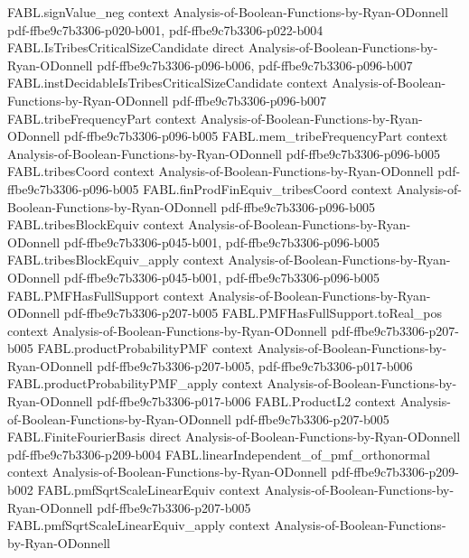 \begin{theorem}
\proofstep
  {FABL.signValue_neg}
  {context}
  {Analysis-of-Boolean-Functions-by-Ryan-ODonnell}
  {pdf-ffbe9c7b3306-p020-b001,
    pdf-ffbe9c7b3306-p022-b004}
\proofstep
  {FABL.IsTribesCriticalSizeCandidate}
  {direct}
  {Analysis-of-Boolean-Functions-by-Ryan-ODonnell}
  {pdf-ffbe9c7b3306-p096-b006,
    pdf-ffbe9c7b3306-p096-b007}
\proofstep
  {FABL.instDecidableIsTribesCriticalSizeCandidate}
  {context}
  {Analysis-of-Boolean-Functions-by-Ryan-ODonnell}
  {pdf-ffbe9c7b3306-p096-b007}
\proofstep
  {FABL.tribeFrequencyPart}
  {context}
  {Analysis-of-Boolean-Functions-by-Ryan-ODonnell}
  {pdf-ffbe9c7b3306-p096-b005}
\proofstep
  {FABL.mem_tribeFrequencyPart}
  {context}
  {Analysis-of-Boolean-Functions-by-Ryan-ODonnell}
  {pdf-ffbe9c7b3306-p096-b005}
\proofstep
  {FABL.tribesCoord}
  {context}
  {Analysis-of-Boolean-Functions-by-Ryan-ODonnell}
  {pdf-ffbe9c7b3306-p096-b005}
\proofstep
  {FABL.finProdFinEquiv_tribesCoord}
  {context}
  {Analysis-of-Boolean-Functions-by-Ryan-ODonnell}
  {pdf-ffbe9c7b3306-p096-b005}
\proofstep
  {FABL.tribesBlockEquiv}
  {context}
  {Analysis-of-Boolean-Functions-by-Ryan-ODonnell}
  {pdf-ffbe9c7b3306-p045-b001,
    pdf-ffbe9c7b3306-p096-b005}
\proofstep
  {FABL.tribesBlockEquiv_apply}
  {context}
  {Analysis-of-Boolean-Functions-by-Ryan-ODonnell}
  {pdf-ffbe9c7b3306-p045-b001,
    pdf-ffbe9c7b3306-p096-b005}
\proofstep
  {FABL.PMFHasFullSupport}
  {context}
  {Analysis-of-Boolean-Functions-by-Ryan-ODonnell}
  {pdf-ffbe9c7b3306-p207-b005}
\proofstep
  {FABL.PMFHasFullSupport.toReal_pos}
  {context}
  {Analysis-of-Boolean-Functions-by-Ryan-ODonnell}
  {pdf-ffbe9c7b3306-p207-b005}
\proofstep
  {FABL.productProbabilityPMF}
  {context}
  {Analysis-of-Boolean-Functions-by-Ryan-ODonnell}
  {pdf-ffbe9c7b3306-p207-b005,
    pdf-ffbe9c7b3306-p017-b006}
\proofstep
  {FABL.productProbabilityPMF_apply}
  {context}
  {Analysis-of-Boolean-Functions-by-Ryan-ODonnell}
  {pdf-ffbe9c7b3306-p017-b006}
\proofstep
  {FABL.ProductL2}
  {context}
  {Analysis-of-Boolean-Functions-by-Ryan-ODonnell}
  {pdf-ffbe9c7b3306-p207-b005}
\proofstep
  {FABL.FiniteFourierBasis}
  {direct}
  {Analysis-of-Boolean-Functions-by-Ryan-ODonnell}
  {pdf-ffbe9c7b3306-p209-b004}
\proofstep
  {FABL.linearIndependent_of_pmf_orthonormal}
  {context}
  {Analysis-of-Boolean-Functions-by-Ryan-ODonnell}
  {pdf-ffbe9c7b3306-p209-b002}
\proofstep
  {FABL.pmfSqrtScaleLinearEquiv}
  {context}
  {Analysis-of-Boolean-Functions-by-Ryan-ODonnell}
  {pdf-ffbe9c7b3306-p207-b005}
\proofstep
  {FABL.pmfSqrtScaleLinearEquiv_apply}
  {context}
  {Analysis-of-Boolean-Functions-by-Ryan-ODonnell}

\end{theorem}
